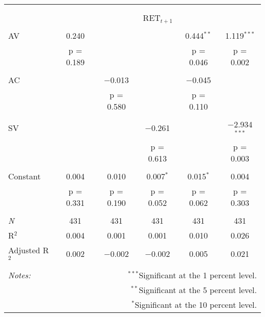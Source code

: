 
\begin{tabular}{@{\extracolsep{5pt}}lccccc} 
\\[-1.8ex]\hline 
\hline \\[-1.8ex] 
\\[-1.8ex] & \multicolumn{5}{c}{RET$_{t+1}$} \\ 
\hline \\[-1.8ex] 
 AV & 0.240 &  &  & 0.444$^{**}$ & 1.119$^{***}$ \\ 
  & p = 0.189 &  &  & p = 0.046 & p = 0.002 \\ 
  & & & & & \\ 
 AC &  & $-$0.013 &  & $-$0.045 &  \\ 
  &  & p = 0.580 &  & p = 0.110 &  \\ 
  & & & & & \\ 
 SV &  &  & $-$0.261 &  & $-$2.934$^{***}$ \\ 
  &  &  & p = 0.613 &  & p = 0.003 \\ 
  & & & & & \\ 
 Constant & 0.004 & 0.010 & 0.007$^{*}$ & 0.015$^{*}$ & 0.004 \\ 
  & p = 0.331 & p = 0.190 & p = 0.052 & p = 0.062 & p = 0.303 \\ 
  & & & & & \\ 
\textit{N} & 431 & 431 & 431 & 431 & 431 \\ 
R$^{2}$ & 0.004 & 0.001 & 0.001 & 0.010 & 0.026 \\ 
Adjusted R$^{2}$ & 0.002 & $-$0.002 & $-$0.002 & 0.005 & 0.021 \\ 
\hline 
\hline \\[-1.8ex] 
\textit{Notes:} & \multicolumn{5}{r}{$^{***}$Significant at the 1 percent level.} \\ 
 & \multicolumn{5}{r}{$^{**}$Significant at the 5 percent level.} \\ 
 & \multicolumn{5}{r}{$^{*}$Significant at the 10 percent level.} \\ 
\end{tabular} 
